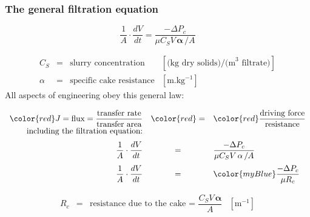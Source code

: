 \begin{frame}\frametitle{The general filtration equation}
	\begin{exampleblock}{}
		\[\dfrac{1}{A} \cdot \dfrac{dV}{dt} = \dfrac{-\Delta P_c}{\mu C_S V  \, \mathbf{ \alpha}\, / A}
			\]
	\end{exampleblock}
	\[
		\begin{array}{rcll}
			C_S  	&=& \text{slurry concentration}				&[\text{(kg dry solids)/(m}^{3}\text{ filtrate)}]\\
			\alpha	&=& \text{specific cake resistance} 		&[\text{m.kg}^{-1}]
		\end{array}
	\]
	All aspects of engineering obey this general law:
	\begin{exampleblock}{}
		\[
		\begin{array}{rcl}
			{\color{red}J = \text{flux} = \dfrac{\text{transfer rate}}{\text{transfer area}}} &{\color{red}=}& {\color{red}\dfrac{\text{driving force}}{\text{resistance}}}\\
			\vspace{6pt}
			\text{including the filtration equation:}\\
			\vspace{6pt}
			\dfrac{1}{A} \cdot \dfrac{dV}{dt} &=& \dfrac{-\Delta P_c}{\mu  C_S V \, \mathbf{ \alpha}\, / A} \\
			\dfrac{1}{A} \cdot \dfrac{dV}{dt} &=& {\color{myBlue}\dfrac{-\Delta P_c}{\mu R_c}}
		\end{array}
		\]
	\end{exampleblock}
	\vspace{-14pt}
	\[
		\begin{array}{rcll}
			R_c  &=& \text{resistance due to the cake = $\dfrac{C_S V \, \mathbf{ \alpha}}{A}$}				&[\text{m}^{-1}]\\
		\end{array}
	\]
\end{frame}

